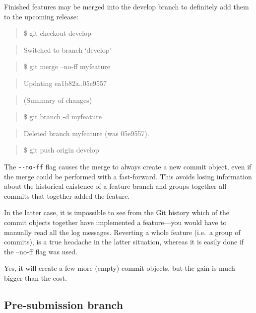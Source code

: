 \documentclass[]{book}
\begin{document}
Finished features may be merged into the develop branch to definitely
add them to the upcoming release:

\begin{quote}
\$ git checkout develop
\end{quote}

\begin{quote}
Switched to branch `develop'
\end{quote}

\begin{quote}
\$ git merge --no-ff myfeature
\end{quote}

\begin{quote}
Updating ea1b82a..05e9557
\end{quote}

\begin{quote}
(Summary of changes)
\end{quote}

\begin{quote}
\$ git branch -d myfeature
\end{quote}

\begin{quote}
Deleted branch myfeature (was 05e9557).
\end{quote}

\begin{quote}
\$ git push origin develop
\end{quote}

The \texttt{-\/-no-ff} flag causes the merge to always create a new
commit object, even if the merge could be performed with a fast-forward.
This avoids losing information about the historical existence of a
feature branch and groups together all commits that together added the
feature.

In the latter case, it is impossible to see from the Git history which
of the commit objects together have implemented a feature---you would
have to manually read all the log messages. Reverting a whole feature
(i.e.~a group of commits), is a true headache in the latter situation,
whereas it is easily done if the --no-ff flag was used.

Yes, it will create a few more (empty) commit objects, but the gain is
much bigger than the cost.

\subsection{Pre-submission branch}\label{pre-submission-branch}
\end{document}
